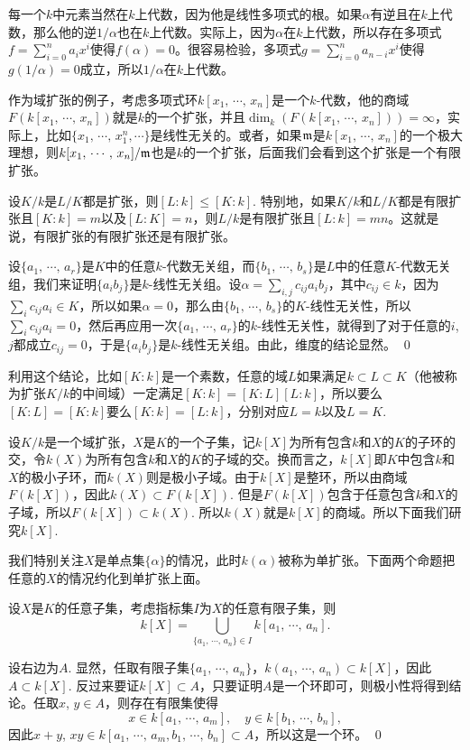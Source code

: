 每一个$k$中元素当然在$k$上代数，因为他是线性多项式的根。如果$\alpha$有逆且在$k$上代数，那么他的逆$1/\alpha$也在$k$上代数。实际上，因为$\alpha$在$k$上代数，所以存在多项式$f=\sum_{i=0}^na_ix^i$使得$f(\alpha)=0$。很容易检验，多项式$g=\sum_{i=0}^na_{n-i}x^i$使得$g(1/\alpha)=0$成立，所以$1/\alpha$在$k$上代数。

作为域扩张的例子，考虑多项式环$k[x_1,\,\cdots,\,x_n]$是一个$k$-代数，他的商域$F(k[x_1,\,\cdots,\,x_n])$就是$k$的一个扩张，并且$\dim_k(F(k[x_1,\,\cdots,\,x_n]))=\infty$，实际上，比如$\{x_1,\,\cdots,\,x_1^n,\cdots\}$是线性无关的。或者，如果$\mathfrak{m}$是$k[x_1,\,\cdots,\,x_n]$的一个极大理想，则$k[x_1,\,\cdots,\,x_n]/\mathfrak{m}$也是$k$的一个扩张，后面我们会看到这个扩张是一个有限扩张。

\pro 设$K/k$是$L/K$都是扩张，则$[L:k]\leq[K:k]$. 特别地，如果$K/k$和$L/K$都是有限扩张且$[K:k]=m$以及$[L:K]=n$，则$L/k$是有限扩张且$[L:k]=mn$。这就是说，有限扩张的有限扩张还是有限扩张。

\proof 
	设$\{a_1,\,\cdots,\,a_r\}$是$K$中的任意$k$-代数无关组，而$\{b_1,\,\cdots,\,b_s\}$是$L$中的任意$K$-代数无关组，我们来证明$\{a_ib_j\}$是$k$-线性无关组。设$\alpha=\sum_{i,j}c_{ij}a_ib_j$，其中$c_{ij}\in k$，因为$\sum_i c_{ij}a_i\in K$，所以如果$\alpha=0$，那么由$\{b_1,\,\cdots,\,b_s\}$的$K$-线性无关性，所以$\sum_i c_{ij}a_i=0$，然后再应用一次$\{a_1,\,\cdots,\,a_r\}$的$k$-线性无关性，就得到了对于任意的$i$, $j$都成立$c_{ij}=0$，于是$\{a_ib_j\}$是$k$-线性无关组。由此，维度的结论显然。
\qed

利用这个结论，比如$[K:k]$是一个素数，任意的域$L$如果满足$k\subset L\subset K$（他被称为扩张$K/k$的中间域）一定满足$[K:k]=[K:L][L:k]$，所以要么$[K:L]=[K:k]$要么$[K:k]=[L:k]$，分别对应$L=k$以及$L=K$. 

\para 设$K/k$是一个域扩张，$X$是$K$的一个子集，记$k[X]$为所有包含$k$和$X$的$K$的子环的交，令$k(X)$为所有包含$k$和$X$的$K$的子域的交。换而言之，$k[X]$即$K$中包含$k$和$X$的极小子环，而$k(X)$则是极小子域。由于$k[X]$是整环，所以由商域$F(k[X])$，因此$k(X)\subset F(k[X])$. 但是$F(k[X])$包含于任意包含$k$和$X$的子域，所以$F(k[X])\subset k(X)$. 所以$k(X)$就是$k[X]$的商域。所以下面我们研究$k[X]$.

我们特别关注$X$是单点集$\{\alpha\}$的情况，此时$k(\alpha)$被称为单扩张。下面两个命题把任意的$X$的情况约化到单扩张上面。

\pro 设$X$是$K$的任意子集，考虑指标集$I$为$X$的任意有限子集，则
\[
	k[X]=\bigcup_{\{a_1,\,\cdots,\,a_n\}\in I} k[a_1,\,\cdots,\,a_n].
\]

\proof
	设右边为$A$. 显然，任取有限子集$\{a_1,\,\cdots,\,a_n\}$，$k(a_1,\,\cdots,\,a_n)\subset k[X]$，因此$A\subset k[X]$. 反过来要证$k[X]\subset A$，只要证明$A$是一个环即可，则极小性将得到结论。任取$x$, $y\in A$，则存在有限集使得
	\[
		x\in k[a_1,\,\cdots,\,a_m],\quad y\in k[b_1,\,\cdots,\,b_n],
	\]
	因此$x+y$, $xy\in k[a_1,\,\cdots,\,a_m,b_1,\,\cdots,\,b_n]\subset A$，所以这是一个环。
\qed

